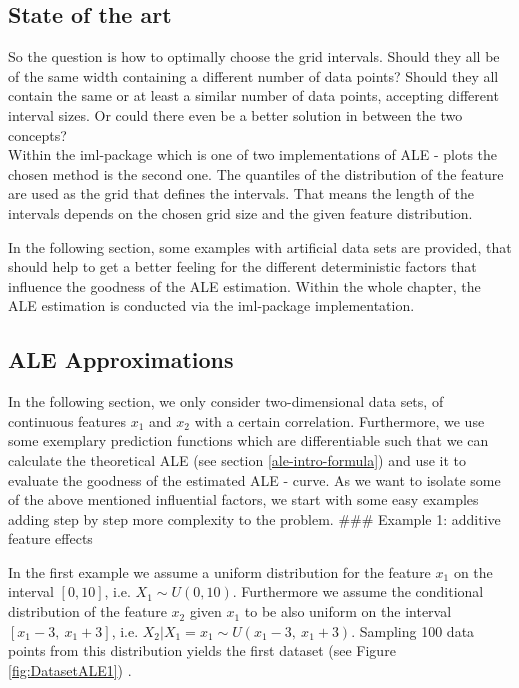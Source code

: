 \documentclass[]{krantz}
\begin{document}
\subsection{State of the art}\label{state-of-the-art}

So the question is how to optimally choose the grid intervals. Should
they all be of the same width containing a different number of data
points? Should they all contain the same or at least a similar number of
data points, accepting different interval sizes. Or could there even be
a better solution in between the two concepts?\\
Within the iml-package which is one of two implementations of ALE -
plots the chosen method is the second one. The quantiles of the
distribution of the feature are used as the grid that defines the
intervals. That means the length of the intervals depends on the chosen
grid size and the given feature distribution.

In the following section, some examples with artificial data sets are
provided, that should help to get a better feeling for the different
deterministic factors that influence the goodness of the ALE estimation.
Within the whole chapter, the ALE estimation is conducted via the
iml-package implementation.

\subsection{ALE Approximations}\label{ale-approximations}

In the following section, we only consider two-dimensional data sets, of
continuous features \(x_1\) and \(x_2\) with a certain correlation.
Furthermore, we use some exemplary prediction functions which are
differentiable such that we can calculate the theoretical ALE (see
section \ref{ale-intro-formula}) and use it to evaluate the goodness of
the estimated ALE - curve. As we want to isolate some of the above
mentioned influential factors, we start with some easy examples adding
step by step more complexity to the problem. \#\#\# Example 1: additive
feature effects

In the first example we assume a uniform distribution for the feature
\(x_1\) on the interval \([0, 10]\), i.e. \(X_1 \sim U(0,10)\).
Furthermore we assume the conditional distribution of the feature
\(x_2\) given \(x_1\) to be also uniform on the interval
\([x_1 - 3,~x_1 + 3 ]\), i.e.
\(X_2 \vert X_1 = x_1 \sim U(x_1 - 3,~x_1 + 3 )\). Sampling 100 data
points from this distribution yields the first dataset (see Figure
\ref{fig:DatasetALE1}) .
\end{document}
